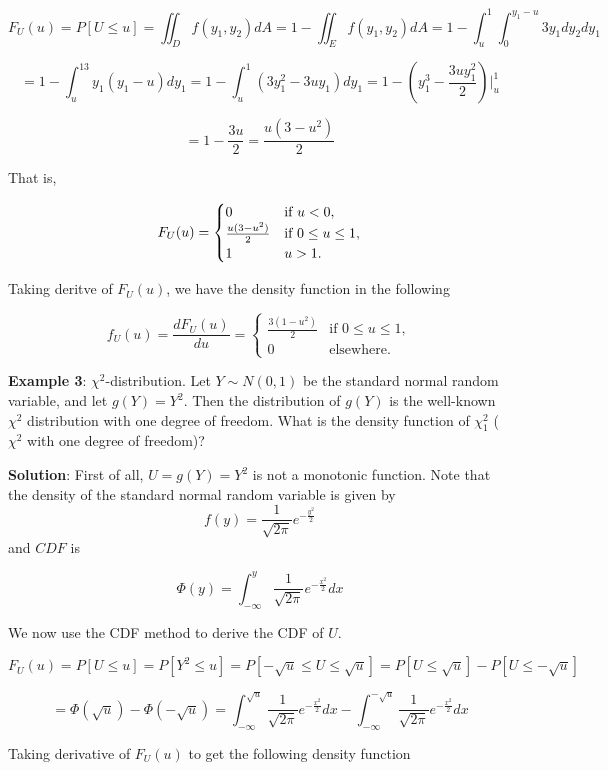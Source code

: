 \documentclass[
]{book}
\begin{document}
\[
F_U(u) = P[U \le u] = \iint_{D}f(y_1, y_2)dA =1- \iint_{E}f(y_1, y_2)dA = 1-\int_u^1\int_0^{y_1-u} 3y_1  dy_2 dy_1 
\]

\[
= 1-\int_u^13y_1(y_1-u)dy_1 = 1-\int_u^1 (3y_1^2-3uy_1)dy_1 = 1-\left( y_1^3 - \frac{3uy_1^2}{2}\right)\bigg|_u^1 
\]

\[
= 1-\frac{3u}{2} = \frac{u(3-u^2)}{2}
\]

That is,

\[
\displaystyle F_U(u) = \begin{cases} 
 0 & \text{if $ u < 0$}, \\  
 \frac{u(3-u^2)}{2} & \text{if $0 \le u \le 1$}, \\ 
 1 & \text{$u>1$}.
 \end{cases}
\]

Taking deritve of \(F_U(u)\), we have the density function in the following

\[
\displaystyle f_U(u) = \frac{dF_U(u)}{du} = \begin{cases} 
 \frac{3(1-u^2)}{2} & \text{if $0 \le u \le 1$}, \\ 
 0 & \text{elsewhere}.
 \end{cases}
\]

\hfill\break

\textbf{\color{red}Example 3}: \(\chi^2\)-distribution. Let \(Y \sim N(0, 1)\) be the standard normal random variable, and let \(g(Y) = Y^2\). Then the distribution of \(g(Y)\) is the well-known \(\chi^2\) distribution with one degree of freedom. What is the density function of \(\chi_1^2\) (\(\chi^2\) with one degree of freedom)?

\textbf{Solution}: First of all, \(U=g(Y) = Y^2\) is not a monotonic function. Note that the density of the standard normal random variable is given by
\[
f(y) = \frac{1}{\sqrt{2\pi}}e^{-\frac{y^2}{2}}
\]
and \(CDF\) is

\[
\Phi(y) = \int_{-\infty}^y \frac{1}{\sqrt{2\pi}}e^{-\frac{x^2}{2}}dx
\]

We now use the CDF method to derive the CDF of \(U\).

\[
F_U(u) = P[U \le u] = P[Y^2 \le u] = P[-\sqrt{u} \le U \le \sqrt{u}] = P[U \le \sqrt{u}] - P[U \le -\sqrt{u}] 
\]

\[
= \Phi(\sqrt{u}) - \Phi(-\sqrt{u}) = \int_{-\infty}^{\sqrt{u}} \frac{1}{\sqrt{2\pi}}e^{-\frac{x^2}{2}}dx - \int_{-\infty}^{-\sqrt{u}} \frac{1}{\sqrt{2\pi}}e^{-\frac{x^2}{2}}dx
\]

Taking derivative of \(F_U(u)\) to get the following density function
\end{document}
